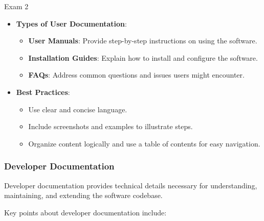 \begin{examnotes}{Exam 2}
\begin{highlight}
        \begin{itemize}
            \item \textbf{Types of User Documentation}:
                \begin{itemize}
                    \item \textbf{User Manuals}: Provide step-by-step instructions on using the software.
                    \item \textbf{Installation Guides}: Explain how to install and configure the software.
                    \item \textbf{FAQs}: Address common questions and issues users might encounter.
                \end{itemize}
            \item \textbf{Best Practices}:
                \begin{itemize}
                    \item Use clear and concise language.
                    \item Include screenshots and examples to illustrate steps.
                    \item Organize content logically and use a table of contents for easy navigation.
                \end{itemize}
        \end{itemize}
    \end{highlight}
    
    \subsubsection*{Developer Documentation}
    
    Developer documentation provides technical details necessary for understanding, maintaining, and extending the software codebase.
    
    \begin{highlight}
        Key points about developer documentation include:
        

\end{highlight}
\end{examnotes}
